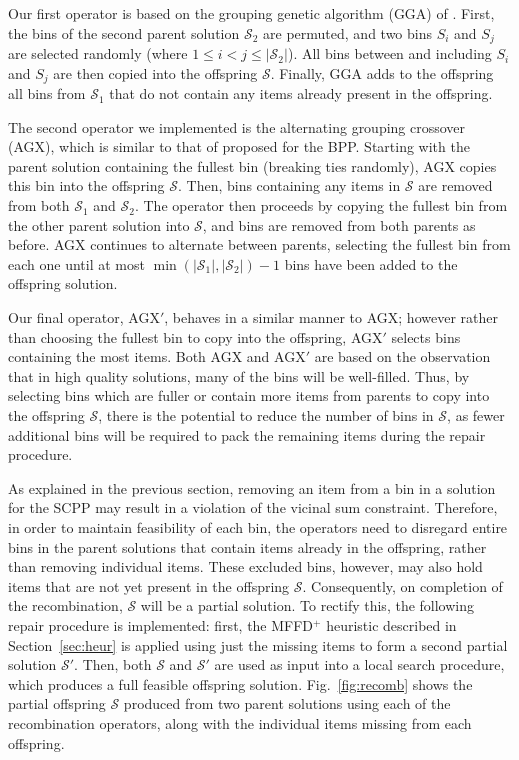 \documentclass[a4paper,11pt,authoryear]{elsarticle}
\begin{document}
Our first operator is based on the grouping genetic algorithm (GGA) of \cite{falkenauer1992}. First, the bins of the second parent solution $\mathcal{S}_2$ are permuted, and two bins $S_i$ and $S_j$ are selected randomly (where $1 \leq i < j \leq |\mathcal{S}_2|$). All bins between and including $S_i$ and $S_j$ are then copied into the offspring $\mathcal{S}$. Finally, GGA adds to the offspring all bins from $\mathcal{S}_1$ that do not contain any items already present in the offspring.

The second operator we implemented is the alternating grouping crossover (AGX), which is similar to that of \cite{quiroz2015} proposed for the BPP. Starting with the parent solution containing the fullest bin (breaking ties randomly), AGX copies this bin into the offspring $\mathcal{S}$. Then, bins containing any items in $\mathcal{S}$ are removed from both $\mathcal{S}_1$ and $\mathcal{S}_2$. The operator then proceeds by copying the fullest bin from the other parent solution into $\mathcal{S}$, and bins are removed from both parents as before. AGX continues to alternate between parents, selecting the fullest bin from each one until at most $\min (|\mathcal{S}_1|,|\mathcal{S}_2|) - 1$ bins have been added to the offspring solution.

Our final operator, AGX$'$, behaves in a similar manner to AGX; however rather than choosing the fullest bin to copy into the offspring, AGX$'$ selects bins containing the most items. Both AGX and AGX$'$ are based on the observation that in high quality solutions, many of the bins will be well-filled. Thus, by selecting bins which are fuller or contain more items from parents to copy into the offspring $\mathcal{S}$, there is the potential to reduce the number of bins in $\mathcal{S}$, as fewer additional bins will be required to pack the remaining items during the repair procedure.

As explained in the previous section, removing an item from a bin in a solution for the SCPP may result in a violation of the vicinal sum constraint. Therefore, in order to maintain feasibility of each bin, the operators need to disregard entire bins in the parent solutions that contain items already in the offspring, rather than removing individual items. These excluded bins, however, may also hold items that are not yet present in the offspring $\mathcal{S}$. Consequently, on completion of the recombination, $\mathcal{S}$ will be a partial solution. To rectify this, the following repair procedure is implemented: first, the MFFD$^+$ heuristic described in Section~\ref{sec:heur} is applied using just the missing items to form a second partial solution $\mathcal{S}'$. Then, both $\mathcal{S}$ and $\mathcal{S}'$ are used as input into a local search procedure, which produces a full feasible offspring solution. Fig.~\ref{fig:recomb} shows the partial offspring $\mathcal{S}$ produced from two parent solutions using each of the recombination operators, along with the individual items missing from each offspring.
\end{document}
